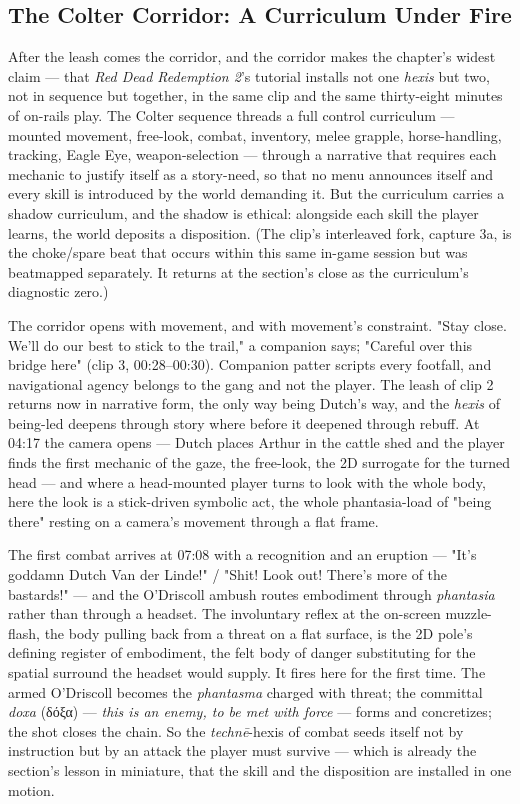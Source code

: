 \documentclass{article}
\newcommand{\gk}[1]{{\greekfont #1}}
\begin{document}
\bigskip

\subsection*{The Colter Corridor: A Curriculum Under Fire}

After the leash comes the corridor, and the corridor makes the chapter's widest claim — that \textit{Red Dead Redemption 2}'s tutorial installs not one \textit{hexis} but two, not in sequence but together, in the same clip and the same thirty-eight minutes of on-rails play. The Colter sequence threads a full control curriculum — mounted movement, free-look, combat, inventory, melee grapple, horse-handling, tracking, Eagle Eye, weapon-selection — through a narrative that requires each mechanic to justify itself as a story-need, so that no menu announces itself and every skill is introduced by the world demanding it. But the curriculum carries a shadow curriculum, and the shadow is ethical: alongside each skill the player learns, the world deposits a disposition. (The clip's interleaved fork, capture 3a, is the choke/spare beat that occurs within this same in-game session but was beatmapped separately. It returns at the section's close as the curriculum's diagnostic zero.)

The corridor opens with movement, and with movement's constraint. "Stay close. We'll do our best to stick to the trail," a companion says; "Careful over this bridge here" (clip 3, 00:28–00:30). Companion patter scripts every footfall, and navigational agency belongs to the gang and not the player. The leash of clip 2 returns now in narrative form, the only way being Dutch's way, and the \textit{hexis} of being-led deepens through story where before it deepened through rebuff. At 04:17 the camera opens — Dutch places Arthur in the cattle shed and the player finds the first mechanic of the gaze, the free-look, the 2D surrogate for the turned head — and where a head-mounted player turns to look with the whole body, here the look is a stick-driven symbolic act, the whole phantasia-load of "being there" resting on a camera's movement through a flat frame.

The first combat arrives at 07:08 with a recognition and an eruption — "It's goddamn Dutch Van der Linde!" / "Shit! Look out! There's more of the bastards!" — and the O'Driscoll ambush routes embodiment through \textit{phantasia} rather than through a headset. The involuntary reflex at the on-screen muzzle-flash, the body pulling back from a threat on a flat surface, is the 2D pole's defining register of embodiment, the felt body of danger substituting for the spatial surround the headset would supply. It fires here for the first time. The armed O'Driscoll becomes the \textit{phantasma} charged with threat; the committal \textit{doxa} (\gk{δόξα}) — \textit{this is an enemy, to be met with force} — forms and concretizes; the shot closes the chain. So the \textit{technē}-hexis of combat seeds itself not by instruction but by an attack the player must survive — which is already the section's lesson in miniature, that the skill and the disposition are installed in one motion.
\end{document}
